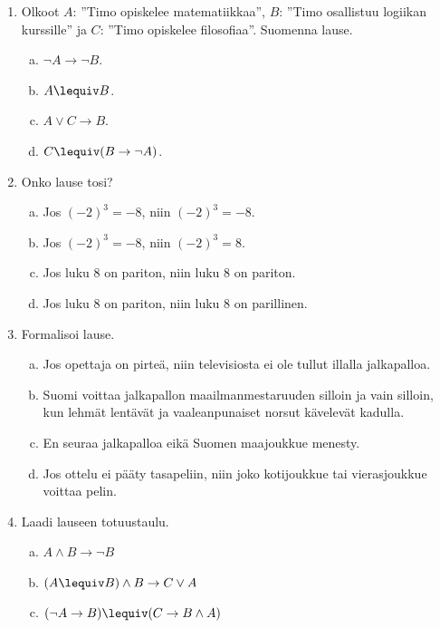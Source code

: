 \begin{enumerate}

\item
Olkoot $A$: ''Timo opiskelee matematiikkaa'', $B$: ''Timo osallistuu logiikan kurssille'' ja $C$: ''Timo opiskelee filosofiaa''. Suomenna lause.
\begin{enumerate}[a)]
\item $\lnot A \to \lnot B$.
\item $A\lequiv B$.
\item $A\lor C \to B$.
\item $C\lequiv (B\to \lnot A)$.
\end{enumerate}

\item Onko lause tosi?
\begin{enumerate}[a)]
\item Jos $(-2)^3= -8$, niin $(-2)^3= -8$.
\item Jos $(-2)^3= -8$, niin $(-2)^3=  8$.
\item Jos luku $8$ on pariton, niin luku $8$ on pariton.
\item Jos luku $8$ on pariton, niin luku $8$ on parillinen.
\end{enumerate}

\item
Formalisoi lause.
\begin{enumerate}[a)]
\item Jos opettaja on pirteä, niin televisiosta ei ole tullut illalla jalkapalloa.
\item Suomi voittaa jalkapallon maailmanmestaruuden silloin ja vain silloin, kun lehmät lentävät ja vaaleanpunaiset norsut kävelevät kadulla.
\item En seuraa jalkapalloa eikä Suomen maajoukkue menesty. 
\item Jos ottelu ei pääty tasapeliin, niin joko kotijoukkue tai vierasjoukkue voittaa pelin.
\end{enumerate}

\newpage

\item Laadi lauseen totuustaulu.
\begin{enumerate}[a)]
\item $A\land B\to \lnot B$
\item $(A\lequiv B)\land B\to C\lor A$
\item $(\lnot A\to B)\lequiv (C\to B\land A)$
\end{enumerate}



\end{enumerate}
